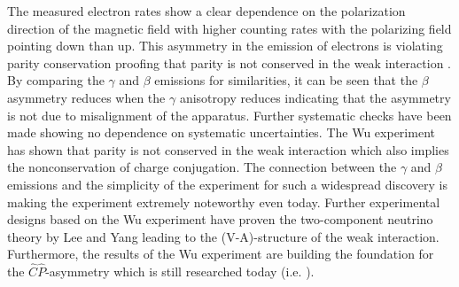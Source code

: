 \newline
The measured electron rates show a clear dependence on the polarization direction of the magnetic field with higher counting rates with the polarizing field pointing down than up.
This asymmetry in the emission of electrons is violating parity conservation proofing that parity is not conserved in the weak interaction \cite{PhysRev.105.1413}.
By comparing the $\gamma$ and $\beta$ emissions for similarities, it can be seen that the $\beta$ asymmetry reduces when the $\gamma$ anisotropy reduces indicating that the asymmetry is not due to misalignment of the apparatus.
Further systematic checks have been made showing no dependence on systematic uncertainties.
\newline
The Wu experiment has shown that parity is not conserved in the weak interaction which also implies the nonconservation of charge conjugation. 
The connection between the $\gamma$ and $\beta$ emissions and the simplicity of the experiment for such a widespread discovery is making the experiment extremely noteworthy even today.
Further experimental designs based on the Wu experiment have proven the two-component neutrino theory by Lee and Yang \cite{PhysRev.105.1671} leading to the (V-A)-structure of the weak interaction.
Furthermore, the results of the Wu experiment are building the foundation for the $\hat C\hat P$-asymmetry which is still researched today (i.e. \cite{AntiSymmetryLHC}).

